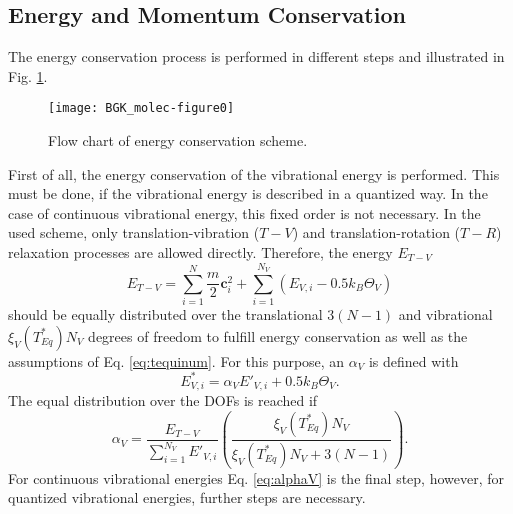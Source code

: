 \documentclass[aip,pof,amsmath,amssymb,preprint]{revtex4-1}
\begin{document}
\subsection{Energy and Momentum Conservation}
The energy conservation process is performed in different steps and illustrated in Fig. \ref{fig:Energyflowchart}. 
\begin{figure}
\centering
\texttt{[image: BGK\_molec-figure0]}
\caption{Flow chart of energy conservation scheme.}
\label{fig:Energyflowchart}
\end{figure}
First of all, the energy conservation of the vibrational energy is performed. This must be done, if the vibrational energy is described in a quantized way. In the case of continuous vibrational energy, this fixed order is not necessary.
In the used scheme, only translation-vibration ($T-V$) and translation-rotation ($T-R$) relaxation processes are allowed directly. Therefore, the energy $E_{T-V}$
\begin{equation} 
E_{T-V}=\sum_{i=1}^N\frac{m}{2}\mathbf c_i^2 + \sum_{i=1}^{N_V} (E_{V,i}-0.5k_B \Theta_V)
\end{equation}
should be equally distributed over the translational $3(N-1)$ and vibrational $\xi_V(T_{Eq}^*)N_V$ degrees of freedom
to fulfill energy conservation as well as the assumptions of Eq. \eqref{eq:tequinum}.
For this purpose, an $\alpha_V$ is defined with
\begin{equation}
E^*_{V,i}=\alpha_VE'_{V,i} + 0.5 k_B \Theta_V .
\end{equation} 
The equal distribution over the DOFs is reached if
\begin{equation}
\alpha_V=\frac{E_{T-V}}{\sum_{i=1}^{N_V} E'_{V,i}}\left(\frac{\xi_V(T_{Eq}^*)N_V}{\xi_V(T_{Eq}^*)N_V+3(N-1)}\right).
\label{eq:alphaV}
\end{equation} 
For continuous vibrational energies Eq. \eqref{eq:alphaV} is the final step, however, for quantized
vibrational energies, further steps are necessary.
\end{document}
